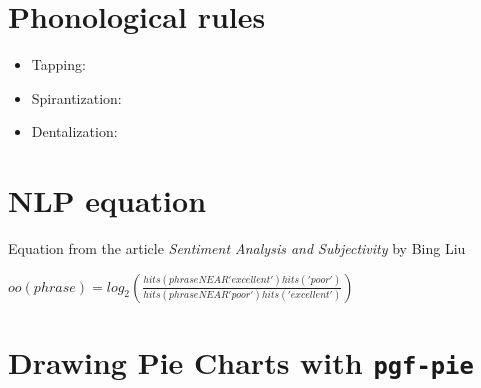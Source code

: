 \documentclass{article}
\begin{document}
\section{Phonological rules}
\newline
\begin{itemize}
    \item Tapping:
        \newline
    \newline
    \item Spirantization:
        \newline
    \newline
    \item Dentalization:
        \newline 
        \phonb{\phonfeat{\textipa{l}}}{[\textipa{\|[\textltilde]}}{}{\textipa{T}}
    \newline
\end{itemize}

\section{NLP equation}
\newline
Equation from the article \textit{Sentiment Analysis and Subjectivity} by Bing Liu
\newline
\newline

\begin{math}
oo(phrase) = log_2 \left(\frac{hits(phraseNEAR 'excellent')hits('poor')}{hits(phraseNEAR 'poor')hits('excellent')}\right)
\end{math}

\newpage
\section{Drawing Pie Charts with \texttt{pgf-pie}}



\end{document}
